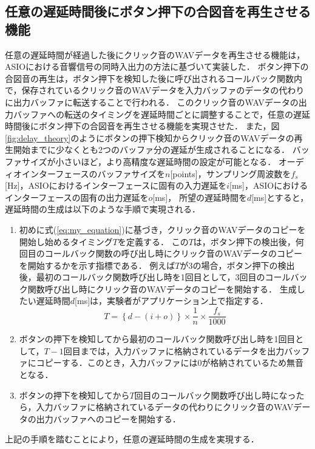 \subsection{任意の遅延時間後にボタン押下の合図音を再生させる機能}
任意の遅延時間が経過した後にクリック音のWAVデータを再生させる機能は，ASIOにおける音響信号の同時入出力の方法に基づいて実装した．
ボタン押下の合図音の再生は，ボタン押下を検知した後に呼び出されるコールバック関数内で，保存されているクリック音のWAVデータを入力バッファのデータの代わりに出力バッファに転送することで行われる．
このクリック音のWAVデータの出力バッファへの転送のタイミングを遅延時間ごとに調整することで，任意の遅延時間後にボタン押下の合図音を再生させる機能を実現させた．
また，図\ref{fig:delay_theory}のようにボタンの押下検知からクリック音のWAVデータの再生開始までに少なくとも2つのバッファ分の遅延が生成されることになる．
バッファサイズが小さいほど，より高精度な遅延時間の設定が可能となる．
オーディオインターフェースのバッファサイズを$n$[points]，サンプリング周波数を$f_{s}$[Hz]，ASIOにおけるインターフェースに固有の入力遅延を$i$[ms]，ASIOにおけるインターフェースの固有の出力遅延を$o$[ms]，
所望の遅延時間を$d$[ms]とすると，遅延時間の生成は以下のような手順で実現される．
\begin{enumerate}[leftmargin=*]
  \item 初めに式(\ref{eq:my_equation})に基づき，クリック音のWAVデータのコピーを開始し始めるタイミング$T$を定義する．
  この$T$は，ボタン押下の検出後，何回目のコールバック関数の呼び出し時にクリック音のWAVデータのコピーを開始するかを示す指標である．
  例えば$T$が3の場合，ボタン押下の検出後，最初のコールバック関数呼び出し時を1回目として，3回目のコールバック関数呼び出し時にクリック音のWAVデータのコピーを開始する．
  生成したい遅延時間$d$[ms]は，実験者がアプリケーション上で指定する．
\begin{equation}
T = \left\{ d - (i + o) \right\} \times \frac{1}{n} \times  \frac{f_s}{1000} \label{eq:my_equation}
\end{equation}
  \item ボタンの押下を検知してから最初のコールバック関数呼び出し時を1回目として，$T-1$回目までは，入力バッファに格納されているデータを出力バッファにコピーする．このとき，入力バッファには0が格納されているため無音となる．
  \item ボタンの押下を検知してから$T$回目のコールバック関数呼び出し時になったら，入力バッファに格納されているデータの代わりにクリック音のWAVデータの出力バッファへのコピーを開始する．
\end{enumerate}
上記の手順を踏むことにより，任意の遅延時間の生成を実現する．
